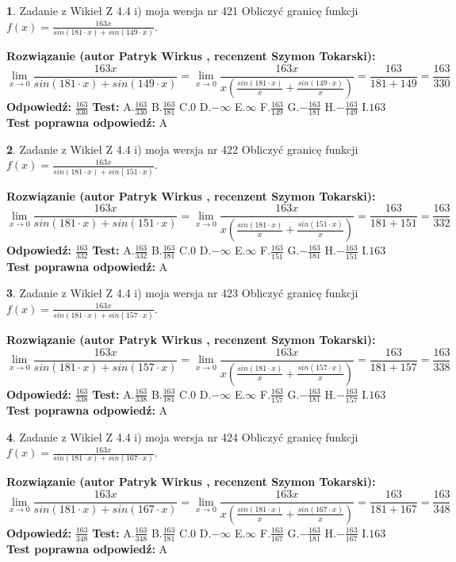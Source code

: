 \documentclass[12pt, a4paper]{article}
\theoremstyle{definition} %
\newtheorem{zad}{}
\newcommand{\zadStart}[1]{\begin{zad}#1\newline}
\newcommand{\zadStop}{\end{zad}}
\newcommand{\rozwStart}[2]{\noindent \textbf{Rozwiązanie (autor #1 , recenzent #2): }\newline}
\newcommand{\rozwStop}{\newline}
\newcommand{\odpStart}{\noindent \textbf{Odpowiedź:}\newline}
\newcommand{\odpStop}{\newline}
\newcommand{\testStart}{\noindent \textbf{Test:}\newline}
\newcommand{\testStop}{\newline}
\newcommand{\kluczStart}{\noindent \textbf{Test poprawna odpowiedź:}\newline}
\newcommand{\kluczStop}{\newline}
\begin{document}
\zadStart{Zadanie z Wikieł Z 4.4 i) moja wersja nr 421}
Obliczyć granicę funkcji $f(x)=\frac{163x}{sin(181\cdot x) +sin(149\cdot x)}$.
\zadStop
\rozwStart{Patryk Wirkus}{Szymon Tokarski}
$$\lim\limits_{x\to 0}\frac{163x}{sin(181\cdot x) +sin(149\cdot x)}=\lim\limits_{x\to 0}\frac{163x}{x(\frac{sin(181\cdot x)}{x}+\frac{sin(149\cdot x)}{x})}=\frac{163}{181+149} = \frac{163}{330}$$
\rozwStop
\odpStart
$\frac{163}{330}$
\odpStop
\testStart
A.$\frac{163}{330}$
B.$\frac{163}{181}$
C.$0$
D.$-\infty$
E.$\infty$
F.$\frac{163}{149}$
G.$-\frac{163}{181}$
H.$-\frac{163}{149}$
I.$163$
\testStop
\kluczStart
A
\kluczStop



\zadStart{Zadanie z Wikieł Z 4.4 i) moja wersja nr 422}
Obliczyć granicę funkcji $f(x)=\frac{163x}{sin(181\cdot x) +sin(151\cdot x)}$.
\zadStop
\rozwStart{Patryk Wirkus}{Szymon Tokarski}
$$\lim\limits_{x\to 0}\frac{163x}{sin(181\cdot x) +sin(151\cdot x)}=\lim\limits_{x\to 0}\frac{163x}{x(\frac{sin(181\cdot x)}{x}+\frac{sin(151\cdot x)}{x})}=\frac{163}{181+151} = \frac{163}{332}$$
\rozwStop
\odpStart
$\frac{163}{332}$
\odpStop
\testStart
A.$\frac{163}{332}$
B.$\frac{163}{181}$
C.$0$
D.$-\infty$
E.$\infty$
F.$\frac{163}{151}$
G.$-\frac{163}{181}$
H.$-\frac{163}{151}$
I.$163$
\testStop
\kluczStart
A
\kluczStop



\zadStart{Zadanie z Wikieł Z 4.4 i) moja wersja nr 423}
Obliczyć granicę funkcji $f(x)=\frac{163x}{sin(181\cdot x) +sin(157\cdot x)}$.
\zadStop
\rozwStart{Patryk Wirkus}{Szymon Tokarski}
$$\lim\limits_{x\to 0}\frac{163x}{sin(181\cdot x) +sin(157\cdot x)}=\lim\limits_{x\to 0}\frac{163x}{x(\frac{sin(181\cdot x)}{x}+\frac{sin(157\cdot x)}{x})}=\frac{163}{181+157} = \frac{163}{338}$$
\rozwStop
\odpStart
$\frac{163}{338}$
\odpStop
\testStart
A.$\frac{163}{338}$
B.$\frac{163}{181}$
C.$0$
D.$-\infty$
E.$\infty$
F.$\frac{163}{157}$
G.$-\frac{163}{181}$
H.$-\frac{163}{157}$
I.$163$
\testStop
\kluczStart
A
\kluczStop



\zadStart{Zadanie z Wikieł Z 4.4 i) moja wersja nr 424}
Obliczyć granicę funkcji $f(x)=\frac{163x}{sin(181\cdot x) +sin(167\cdot x)}$.
\zadStop
\rozwStart{Patryk Wirkus}{Szymon Tokarski}
$$\lim\limits_{x\to 0}\frac{163x}{sin(181\cdot x) +sin(167\cdot x)}=\lim\limits_{x\to 0}\frac{163x}{x(\frac{sin(181\cdot x)}{x}+\frac{sin(167\cdot x)}{x})}=\frac{163}{181+167} = \frac{163}{348}$$
\rozwStop
\odpStart
$\frac{163}{348}$
\odpStop
\testStart
A.$\frac{163}{348}$
B.$\frac{163}{181}$
C.$0$
D.$-\infty$
E.$\infty$
F.$\frac{163}{167}$
G.$-\frac{163}{181}$
H.$-\frac{163}{167}$
I.$163$
\testStop
\kluczStart
A
\kluczStop
\end{document}
